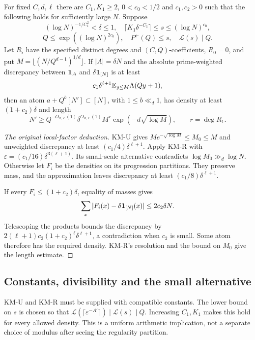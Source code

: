 \begin{proposition}\label{p:KMTT}
\leanok
For fixed $C,d,\ell$ there are $C_1,K_1\geq2$, $0<c_0<1/2$ and $c_1,c_2>0$ such that the following holds for sufficiently large $N$. Suppose
\[
 (\log N)^{-1/C_1^2}<\delta\leq1,\quad
 \lceil K_1\delta^{-C_1}\rceil\leq s\leq(\log N)^{c_0},
\]
\[
 Q\leq\exp((\log N)^{2c_0}),\quad P^+(Q)\leq s,\quad \mathcal L(s)\mid Q.
\]
Let $R_i$ have the specified distinct degrees and $(C,Q)$-coefficients, $R_0=0$, and put $M=\lfloor(N/Q^{d-1})^{1/d}\rfloor$. If $|A|=\delta N$ and the absolute prime-weighted discrepancy between $\mathbf 1_A$ and $\delta\mathbf 1_{[N]}$ is at least
\[
 c_1\delta^{\ell+1}\mathbb E_{y\leq M}\Lambda(Qy+1),
\]
then an atom $a+Q^b[N']\subset[N]$, with $1\leq b\ll_d1$, has density at least $(1+c_2)\delta$ and length
\[
 N'\geq Q^{-O_{d,\ell}(1)}\delta^{O_{d,\ell}(1)}
 M^r\exp(-d\sqrt{\log M}),\qquad r=\deg R_1.
\]
\end{proposition}
\begin{proof}[The original local-factor deduction]
\leanok
KM-U gives $M e^{-\sqrt{\log M}}\leq M_0\leq M$ and unweighted discrepancy at least $(c_1/4)\delta^{\ell+1}$. Apply KM-R with $\varepsilon=(c_1/16)\delta^{3(\ell+1)}$. Its small-scale alternative contradicts $\log M_0\gg_d\log N$. Otherwise let $F_i$ be the densities on its progression partitions. They preserve mass, and the approximation leaves discrepancy at least $(c_1/8)\delta^{\ell+1}$.

If every $F_i\leq(1+c_2)\delta$, equality of masses gives
\[
 \sum_x|F_i(x)-\delta\mathbf 1_{[N]}(x)|\leq2c_2\delta N.
\]
Telescoping the products bounds the discrepancy by
$2(\ell+1)c_2(1+c_2)^\ell\delta^{\ell+1}$, a contradiction when $c_2$ is small. Some atom therefore has the required density. KM-R's resolution and the bound on $M_0$ give the length estimate.
\end{proof}
\ifDetailed
\subsection*{Constants, divisibility and the small alternative}
KM-U and KM-R must be supplied with compatible constants. The lower bound on $s$ is chosen so that $\mathcal L(\lceil\varepsilon^{-A'}\rceil)\mid\mathcal L(s)\mid Q$. Increasing $C_1,K_1$ makes this hold for every allowed density. This is a uniform arithmetic implication, not a separate choice of modulus after seeing the regularity partition.

